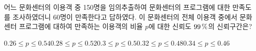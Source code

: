 어느 문화센터의 이용객 중 150명을 임의추출하여 문화센터의 프로그램에 대한 만족도를 조사하였더니 60명이 만족한다고 답하였다. 이 문화센터의 전체 이용객 중에서 문화센터 프로그램에 대하여 만족하는 이용객의 비율 $p$에 대한 신뢰도 $99\mkern3mu \%$의 신뢰구간은? 
\begin{choicesii}{$0.26\le p\le 0.54$}{$0.28\le p\le 0.52$}{$0.3\le p\le 0.5$}{$0.32\le p\le 0.48$}{$0.34\le p\le 0.46$}\end{choicesii}
